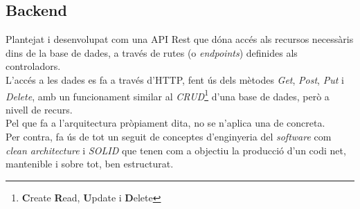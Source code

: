 \subsection{Backend}
\label{arquitecura:global_backend}
Plantejat i desenvolupat com una API Rest que dóna accés als recursos necessàris dins de la base de dades, a través de rutes (o \textit{endpoints}) definides als controladors.\\
\newline L'accés a les dades es fa a través d'HTTP, fent ús dels mètodes \textit{Get}, \textit{Post}, \textit{Put} i \textit{Delete}, amb un funcionament similar al \textit{CRUD}\footnote{\textbf{C}reate \textbf{R}ead, \textbf{U}pdate i \textbf{D}elete} d'una base de dades, però a nivell de recurs.\\
\newline Pel que fa a l'arquitectura pròpiament dita, no se n'aplica una de concreta.\\
Per contra, fa ús de tot un seguit de conceptes d'enginyeria del \textit{software} com \textit{clean architecture} i \textit{SOLID}  que tenen com a objectiu la producció d'un codi net, mantenible i sobre tot, ben estructurat.\\
